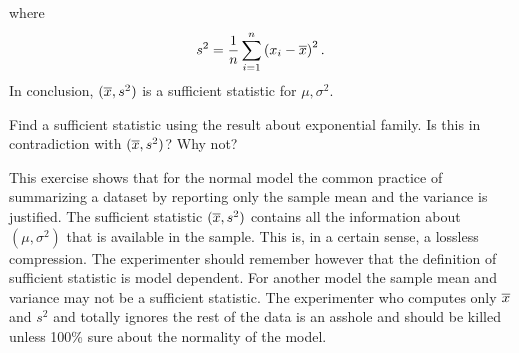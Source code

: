 where
\begin{equation*}
	s^{2}=\frac{1}{n}\sum_{i=1}^{n}\left(x_{i}-\overline{x}\right)^{2}.
\end{equation*}
In conclusion, $(\overline{x},s^{2})$ is a sufficient statistic for $\mu,\sigma^{2}$.
\begin{homework}
	 Find a sufficient statistic using the result about exponential family. Is this in contradiction with $(\overline{x},s^{2})$? Why not?
\end{homework}
\begin{remark}
	This exercise shows that for the normal model the common practice of summarizing a dataset by reporting only the sample mean and the variance is justified. The sufficient statistic $(\overline{x},s^{2})$ contains all the information about $(\mu,\sigma^{2})$ that is available in the sample. This is, in a certain sense, a lossless compression. The experimenter should remember however that the definition of sufficient statistic is model dependent. For another model the sample mean and variance may not be a sufficient statistic. The experimenter who computes only $\overline{x}$ and $s^{2}$ and totally ignores the rest of the data is an asshole and should be killed unless 100\% sure about the normality of the model.
\end{remark}